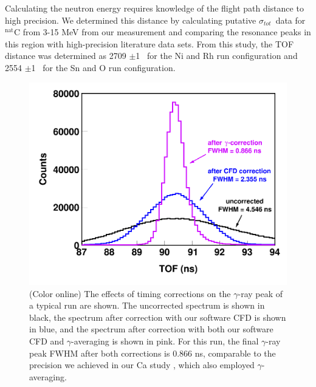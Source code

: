 \documentclass[twocolumn,secnumarabic,amssymb, nobibnotes, aps, prl,
superscriptaddress, nobalancelastpage]{revtex4}
\newcommand{\tot}{\ensuremath{\sigma_{tot}}}
\begin{document}
Calculating the neutron energy requires knowledge of the flight path
distance to high precision. We determined this distance by calculating 
putative \tot\ data for $^{\text{nat}}$C from 3-15 MeV from our measurement and 
comparing the resonance peaks in this region with high-precision literature data
sets. From this study, the TOF distance was determined as 2709 $\pm$1
\centi\meter\ for the Ni and Rh run configuration and 2554
$\pm$1 \centi\meter\ for the Sn and O run configuration.
\begin{figure}
    \includegraphics[width=\linewidth]{figures/TimeCorrections.png}
    \caption{(Color online) The effects of timing corrections on the $\gamma$-ray
        peak of a typical run are shown. The uncorrected spectrum is shown in black,
        the spectrum after correction with our software CFD is shown in blue,
        and the spectrum after correction with both our software CFD and
        $\gamma$-averaging is 
        shown in pink. For this run, the final $\gamma$-ray peak 
        FWHM after both corrections is 0.866 ns, comparable to the precision we
        achieved in our Ca study \cite{Shane2010}, which also employed $\gamma$-
        averaging.}
    \label{TimingCorrectionStudy}
\end{figure}
\end{document}
